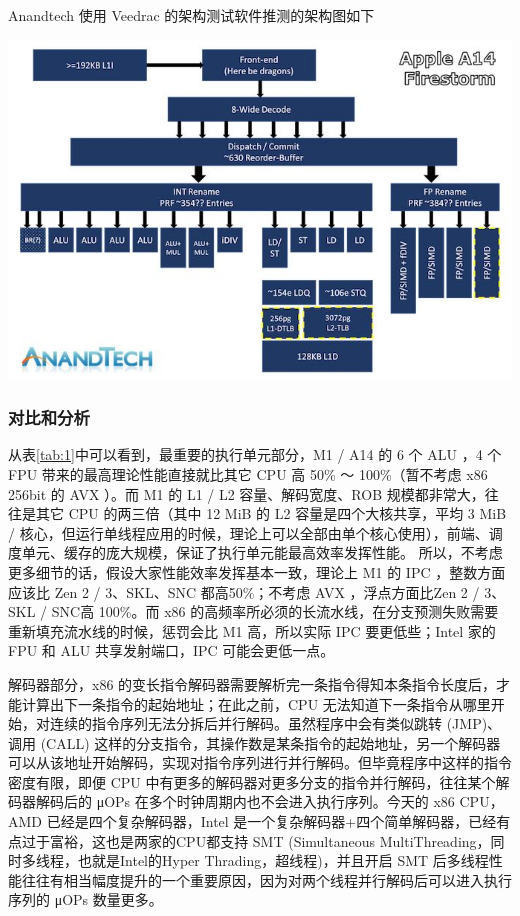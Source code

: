 \documentclass[a4paper]{article}
\begin{document}
Anandtech 使用 Veedrac 的架构测试软件推测的架构图如下

\includegraphics[width=\textwidth]{arch.jpg}

\subsubsection{对比和分析}

从表\ref{tab:1}中可以看到，最重要的执行单元部分，M1 / A14 的 6 个 ALU ，4 个 FPU 带来的最高理论性能直接就比其它 CPU 高 50\% ～ 100\%（暂不考虑 x86 256bit 的 AVX ）。而 M1 的 L1 / L2 容量、解码宽度、ROB 规模都非常大，往往是其它 CPU 的两三倍（其中 12 MiB 的 L2 容量是四个大核共享，平均 3  MiB / 核心，但运行单线程应用的时候，理论上可以全部由单个核心使用），前端、调度单元、缓存的庞大规模，保证了执行单元能最高效率发挥性能。
所以，不考虑更多细节的话，假设大家性能效率发挥基本一致，理论上 M1 的 IPC ，整数方面应该比 Zen 2 / 3、SKL、SNC 都高50\%；不考虑 AVX ，浮点方面比Zen 2 / 3、SKL / SNC高 100\%。而 x86 的高频率所必须的长流水线，在分支预测失败需要重新填充流水线的时候，惩罚会比 M1 高，所以实际 IPC 要更低些；Intel 家的 FPU 和 ALU 共享发射端口，IPC 可能会更低一点。

解码器部分，x86 的变长指令解码器需要解析完一条指令得知本条指令长度后，才能计算出下一条指令的起始地址；在此之前，CPU 无法知道下一条指令从哪里开始，对连续的指令序列无法分拆后并行解码。虽然程序中会有类似跳转 (JMP)、调用 (CALL) 这样的分支指令，其操作数是某条指令的起始地址，另一个解码器可以从该地址开始解码，实现对指令序列进行并行解码。但毕竟程序中这样的指令密度有限，即便 CPU 中有更多的解码器对更多分支的指令并行解码，往往某个解码器解码后的 μOPs 在多个时钟周期内也不会进入执行序列。今天的 x86 CPU，AMD 已经是四个复杂解码器，Intel 是一个复杂解码器+四个简单解码器，已经有点过于富裕，这也是两家的CPU都支持 SMT (Simultaneous MultiThreading，同时多线程，也就是Intel的Hyper Thrading，超线程)，并且开启 SMT 后多线程性能往往有相当幅度提升的一个重要原因，因为对两个线程并行解码后可以进入执行序列的 μOPs 数量更多。
\end{document}
